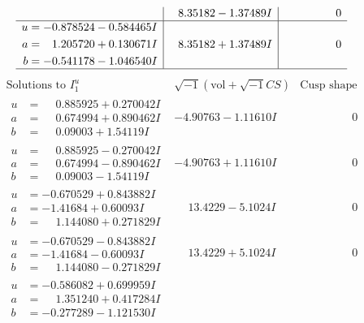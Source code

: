 \documentclass[1p]{elsarticle_modified}
\theoremstyle{definition}
\newcommand{\I}{\sqrt{-1}}
\begin{document}
$$\begin{array}{c|c|c}
 & \phantom{-}8.35182 - 1.37489 I & \phantom{-0.000000 } 0 \\ \hline\begin{aligned}
u &= -0.878524 - 0.584465 I \\
a &= \phantom{-}1.205720 + 0.130671 I \\
b &= -0.541178 - 1.046540 I\end{aligned}
 & \phantom{-}8.35182 + 1.37489 I & \phantom{-0.000000 } 0\\
 \hline 
 \end{array}$$\newpage$$\begin{array}{c|c|c}  
\text{Solutions to }I^u_{1}& \I (\text{vol} + \sqrt{-1}CS) & \text{Cusp shape}\\
 \hline 
\begin{aligned}
u &= \phantom{-}0.885925 + 0.270042 I \\
a &= \phantom{-}0.674994 + 0.890462 I \\
b &= \phantom{-}0.09003 + 1.54119 I\end{aligned}
 & -4.90763 - 1.11610 I & \phantom{-0.000000 } 0 \\ \hline\begin{aligned}
u &= \phantom{-}0.885925 - 0.270042 I \\
a &= \phantom{-}0.674994 - 0.890462 I \\
b &= \phantom{-}0.09003 - 1.54119 I\end{aligned}
 & -4.90763 + 1.11610 I & \phantom{-0.000000 } 0 \\ \hline\begin{aligned}
u &= -0.670529 + 0.843882 I \\
a &= -1.41684 + 0.60093 I \\
b &= \phantom{-}1.144080 + 0.271829 I\end{aligned}
 & \phantom{-}13.4229 - 5.1024 I & \phantom{-0.000000 } 0 \\ \hline\begin{aligned}
u &= -0.670529 - 0.843882 I \\
a &= -1.41684 - 0.60093 I \\
b &= \phantom{-}1.144080 - 0.271829 I\end{aligned}
 & \phantom{-}13.4229 + 5.1024 I & \phantom{-0.000000 } 0 \\ \hline\begin{aligned}
u &= -0.586082 + 0.699959 I \\
a &= \phantom{-}1.351240 + 0.417284 I \\
b &= -0.277289 - 1.121530 I\end{aligned}

\end{array}$$
\end{document}
